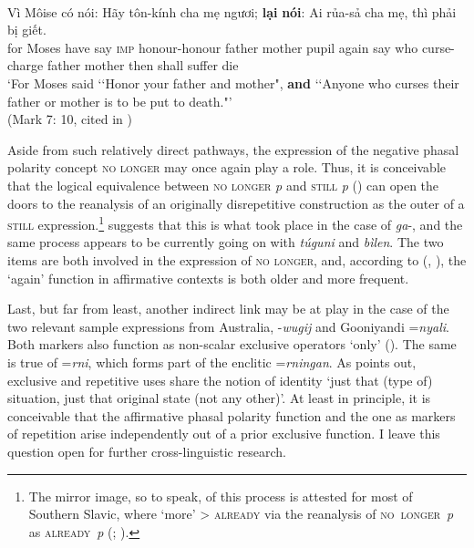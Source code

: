 \begin{exe}
	\ex {}\label{exIterativeVietnamese}\\
	\gll Vì Môise có nói: Hãy tôn-kính cha mẹ ngươi; \textbf{lại} \textbf{nói}: Ai rủa-sả cha mẹ, thì phải bị giết.\\
	for Moses have say \textsc{imp} honour-honour father mother pupil again say who curse-charge father mother then shall suffer die\\
	\glt \lq For Moses said \lq\lq Honor your father and mother", \textbf{and} \lq\lq Anyone who curses their father or mother is to be put to death."' \\(Mark 7: 10, cited in \cite[76]{Waelchli2006})
\end{exe}

Aside from such relatively direct pathways, the expression of the negative phasal polarity concept \textsc{no longer} may once again play a role. Thus, it is conceivable that the logical equivalence between \textsc{no longer} \textit{p} and \mbox{\neg\textsc{still}} \textit{p} () can open the doors to the reanalysis of an originally disrepetitive construction as the outer  of a \textsc{still} expression.\footnote{The mirror image, so to speak, of this process is attested for most of Southern Slavic, where \lq more' > \textsc{already} via the reanalysis of \mbox{\textsc{no longer} \textit{p}} as \mbox{\textsc{already} \neg\textit{p}} (\cite[60]{vanderAuwera1998}; \cite{Buchholz1991}).} \Textcite[92–93]{vanBaar1997} suggests that this is what took place in the case of  \mbox{\textit{ga}-}, and the same process appears to be currently going on with  \textit{túguni} and \textit{bìlen}. The two  items are both involved in the expression of \textsc{no longer}, and, according to \citeauthor{DombrowskyHahn2020} (\citeyear{DombrowskyHahn2020}, \citeyear{DombrowskyHahn2021}), the \lq again' function in affirmative contexts is both older and more frequent.

Last, but far from least, another indirect link may be at play in the case of the two relevant sample expressions from Australia,  \mbox{-\textit{wugij}} and Gooniyandi \mbox{=\textit{nyali}}. Both markers also function as non-scalar exclusive operators \lq only' (). The same is true of  \mbox{=\textit{rni}}, which forms part of the enclitic \mbox{=\textit{rningan}}. As \textcite{SchultzeBerndt2002} points out, exclusive and repetitive uses share the notion of identity \lq just that (type of) situation, just that original state (not any other)'. At least in principle, it is conceivable that the affirmative phasal polarity function and the one as markers of repetition arise independently out of a prior exclusive function. I leave this question open for further cross-linguistic research.

